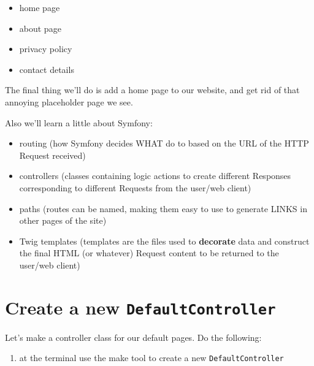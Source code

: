 \documentclass[a4paperpaper,openright]{book}
\newenvironment{Shaded}{}{}
\newcommand{\ExtensionTok}[1]{#1}
\newcommand{\NormalTok}[1]{#1}
\providecommand{\tightlist}{%
  \setlength{\itemsep}{0pt}\setlength{\parskip}{0pt}}
\begin{document}
\begin{itemize}
\tightlist
\item
  home page
\item
  about page
\item
  privacy policy
\item
  contact details
\end{itemize}

The final thing we'll do is add a home page to our website, and get rid
of that annoying placeholder page we see.

Also we'll learn a little about Symfony:

\begin{itemize}
\tightlist
\item
  routing (how Symfony decides WHAT do to based on the URL of the HTTP
  Request received)
\item
  controllers (classes containing logic actions to create different
  Responses corresponding to different Requests from the user/web
  client)
\item
  paths (routes can be named, making them easy to use to generate LINKS
  in other pages of the site)
\item
  Twig templates (templates are the files used to \textbf{decorate} data
  and construct the final HTML (or whatever) Request content to be
  returned to the user/web client)
\end{itemize}

\hypertarget{create-a-new-defaultcontroller}{%
\section{\texorpdfstring{Create a new
\texttt{DefaultController}}{Create a new DefaultController}}\label{create-a-new-defaultcontroller}}

Let's make a controller class for our default pages. Do the following:

\begin{enumerate}
\def\labelenumi{\arabic{enumi}.}
\tightlist
\item
  at the terminal use the make tool to create a new
  \texttt{DefaultController}
\end{enumerate}

\begin{Shaded}
\end{Shaded}
\end{document}
